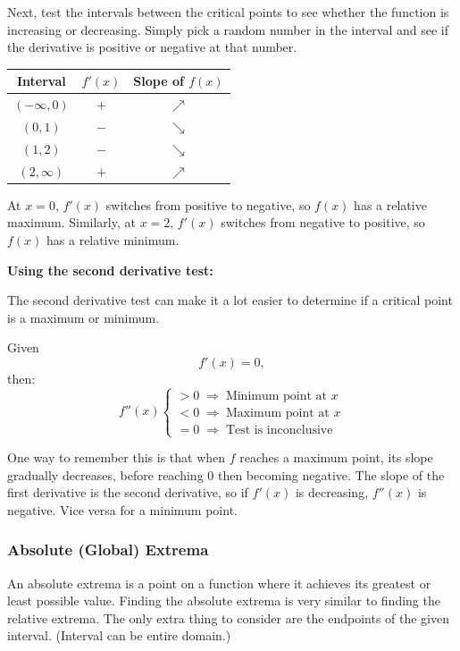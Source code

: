 \documentclass[12pt]{article}
\begin{document}
Next, test the intervals between the critical points to see whether the function is increasing or decreasing. Simply pick a random number in the interval and see if the derivative is positive or negative at that number.
\begin{center}
	\begin{tabular}{|c|c|c|}
		\hline
		Interval       & $f'(x)$ & Slope of $f(x)$ \\
		\hline \hline
		$(-\infty, 0)$ & $+$     & $\nearrow$      \\
		\hline
		$(0, 1)$       & $-$     & $\searrow$      \\
		\hline
		$(1, 2)$       & $-$     & $\searrow$      \\
		\hline
		$(2, \infty)$  & $+$     & $\nearrow$      \\
		\hline
	\end{tabular}
\end{center}

At $x=0$, $f'(x)$ switches from positive to negative, so $f(x)$ has a relative maximum. Similarly, at $x=2$, $f'(x)$ switches from negative to positive, so $f(x)$ has a relative minimum.

\noindent \textbf{Using the second derivative test:}

The second derivative test can make it a lot easier to determine if a critical point is a maximum or minimum.

\noindent Given
\[ f'(x) = 0, \]
then:
\[ f''(x) \begin{cases}
		>0 \; \Rightarrow \; \text{Minimum point at $x$} \\
		<0 \; \Rightarrow \; \text{Maximum point at $x$} \\
		=0 \; \Rightarrow \; \text{Test is inconclusive}
	\end{cases} \]

One way to remember this is that when $f$ reaches a maximum point, its slope gradually decreases, before reaching $0$ then becoming negative. The slope of the first derivative is the second derivative, so if $f'(x)$ is decreasing, $f''(x)$ is negative. Vice versa for a minimum point.

\subsubsection{Absolute (Global) Extrema}
An absolute extrema is a point on a function where it achieves its greatest or least possible value. Finding the absolute extrema is very similar to finding the relative extrema. The only extra thing to consider are the endpoints of the given interval. (Interval can be entire domain.)
\end{document}
